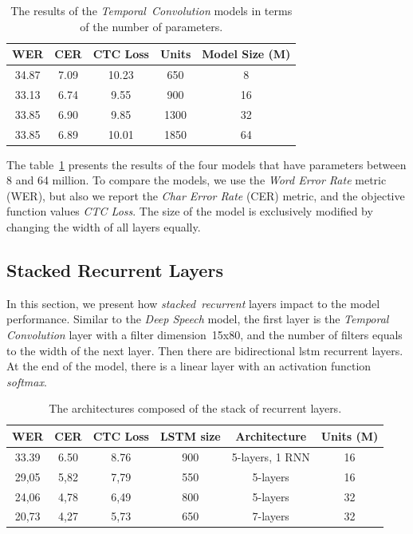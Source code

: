 \begin{table}[h!]
\vspace*{10pt}
\centering
 \begin{tabular}{c c c c c}
  \toprule
  WER & CER & CTC Loss & Units & Model Size (M) \\
  \midrule
    34.87 &	7.09 &	10.23	& 650   & 8	 \\
    33.13 &	6.74 &	9.55	& 900   & 16 \\
    33.85 &	6.90 &	9.85	& 1300  & 32 \\
    33.85 &	6.89 &	10.01	& 1850  & 64 \\
  \bottomrule
 \end{tabular}
\caption{
The results of the \textit{Temporal~Convolution} models in terms of the number of parameters.
}
\label{table:temporal-convolution}
\end{table}

The table~\ref{table:temporal-convolution} presents the results of the four models that
have parameters between 8 and 64 million.
To compare the models, we use the \textit{Word Error Rate} metric (WER), but also
we report the \textit{Char Error Rate} (CER) metric, and the objective function values \textit{CTC Loss}.
The size of the model is exclusively modified by changing the width of all layers equally.


\subsection*{Stacked Recurrent Layers}

In this section, we present how \textit{stacked~recurrent} layers impact to the model performance.
Similar to the \textit{Deep Speech} model, the first layer is the \textit{Temporal Convolution} layer with
a filter dimension~15x80, and the number of filters equals to the width of the next layer.
Then there are bidirectional \acrshort{lstm} recurrent layers.
At the end of the model, there is a linear layer with an activation function \textit{softmax}.

\begin{table}[h!]
\vspace*{10pt}
\centering
 \begin{tabular}{c c c c c c}
  \toprule
   WER & CER & CTC Loss & LSTM size	& Architecture & Units (M)\\
   \midrule
    33.39	& 6.50	& 8.76  & 900 & 5-layers, 1 RNN & 16 \\
  \midrule
    29,05 &	5,82 & 7,79 & 550 &	5-layers & 16 \\
    24,06 &	4,78 & 6,49 & 800 &	5-layers & 32 \\
    20,73 &	4,27 & 5,73 & 650 &	7-layers & 32 \\
  \bottomrule
 \end{tabular}
\caption{
The architectures composed of the stack of recurrent layers.
}
\label{table:stacked-recurrent-layers}
\end{table}

